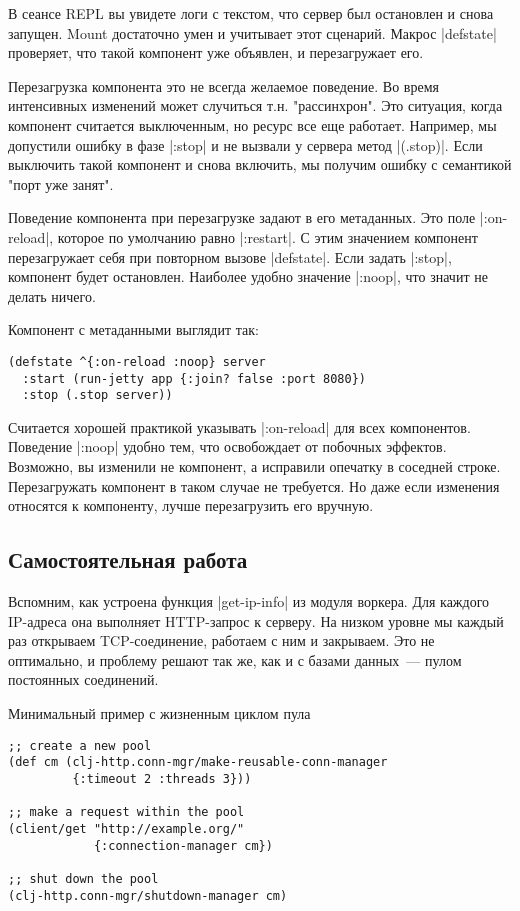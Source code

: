 В сеансе REPL вы увидете логи с текстом, что сервер был остановлен и снова
запущен. Mount достаточно умен и учитывает этот сценарий. Макрос \spverb|defstate|
проверяет, что такой компонент уже объявлен, и перезагружает его.

Перезагрузка компонента это не всегда желаемое поведение. Во время интенсивных
изменений может случиться т.н. "рассинхрон". Это ситуация, когда компонент
считается выключенным, но ресурс все еще работает. Например, мы допустили ошибку
в фазе \spverb|:stop| и не вызвали у сервера метод \spverb|(.stop)|. Если выключить такой
компонент и снова включить, мы получим ошибку с семантикой "порт уже занят".

Поведение компонента при перезагрузке задают в его метаданных. Это поле
\spverb|:on-reload|, которое по умолчанию равно \spverb|:restart|. С этим значением компонент
перезагружает себя при повторном вызове \spverb|defstate|. Если задать \spverb|:stop|,
компонент будет остановлен. Наиболее удобно значение \spverb|:noop|, что значит не
делать ничего.

Компонент с метаданными выглядит так:

\begin{verbatim}
(defstate ^{:on-reload :noop} server
  :start (run-jetty app {:join? false :port 8080})
  :stop (.stop server))
\end{verbatim}

Считается хорошей практикой указывать \spverb|:on-reload| для всех
компонентов. Поведение \spverb|:noop| удобно тем, что освобождает от побочных
эффектов. Возможно, вы изменили не компонент, а исправили опечатку в соседней
строке. Перезагружать компонент в таком случае не требуется. Но даже если
изменения относятся к компоненту, лучше перезагрузить его вручную.

\subsection{Самостоятельная работа}

Вспомним, как устроена функция \spverb|get-ip-info| из модуля воркера. Для каждого
IP-адреса она выполняет HTTP-запрос к серверу. На низком уровне мы каждый раз
открываем TCP-соединение, работаем с ним и закрываем. Это не оптимально, и
проблему решают так же, как и с базами данных~--- пулом постоянных соединений.

Минимальный пример с жизненным циклом пула

\begin{verbatim}
;; create a new pool
(def cm (clj-http.conn-mgr/make-reusable-conn-manager
         {:timeout 2 :threads 3}))

;; make a request within the pool
(client/get "http://example.org/"
            {:connection-manager cm})

;; shut down the pool
(clj-http.conn-mgr/shutdown-manager cm)
\end{verbatim}

